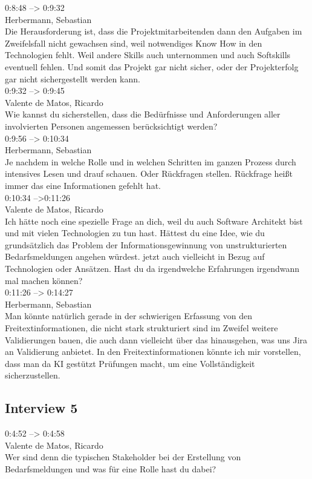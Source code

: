 0:8:48 --> 0:9:32\\
Herbermann, Sebastian\\
Die Herausforderung ist, dass die Projektmitarbeitenden dann den Aufgaben im Zweifelsfall nicht gewachsen sind, weil notwendiges Know How in den Technologien fehlt. Weil andere Skills auch unternommen und auch Softskills eventuell fehlen. Und somit das Projekt gar nicht sicher, oder der Projekterfolg gar nicht sichergestellt werden kann.\\

0:9:32 --> 0:9:45\\
Valente de Matos, Ricardo\\
Wie kannst du sicherstellen, dass die Bedürfnisse und Anforderungen aller involvierten Personen angemessen berücksichtigt werden?\\

0:9:56 --> 0:10:34\\
Herbermann, Sebastian\\
Je nachdem in welche Rolle und in welchen Schritten im ganzen Prozess durch intensives Lesen und drauf schauen. Oder Rückfragen stellen. Rückfrage heißt immer das eine Informationen gefehlt hat.\\

0:10:34 -->0:11:26\\
Valente de Matos, Ricardo\\
Ich hätte noch eine spezielle Frage an dich, weil du auch Software Architekt bist und mit vielen Technologien zu tun hast. Hättest du eine Idee, wie du grundsätzlich das Problem der Informationsgewinnung von unstrukturierten Bedarfsmeldungen angehen würdest. jetzt auch vielleicht in Bezug auf Technologien oder Ansätzen. Hast du da irgendwelche Erfahrungen irgendwann mal machen können?\\

0:11:26 --> 0:14:27\\
Herbermann, Sebastian\\
Man könnte natürlich gerade in der schwierigen Erfassung von den Freitextinformationen, die nicht stark strukturiert sind im Zweifel weitere Validierungen bauen, die auch dann vielleicht über das hinausgehen, was uns Jira an Validierung anbietet. In den Freitextinformationen könnte ich mir vorstellen, dass man da KI gestützt Prüfungen macht, um eine Vollständigkeit sicherzustellen.\\
\subsection{Interview 5}
\label{interview5}
0:4:52 --> 0:4:58\\
Valente de Matos, Ricardo\\
Wer sind denn die typischen Stakeholder bei der Erstellung von Bedarfsmeldungen und was für eine Rolle hast du dabei?\\

